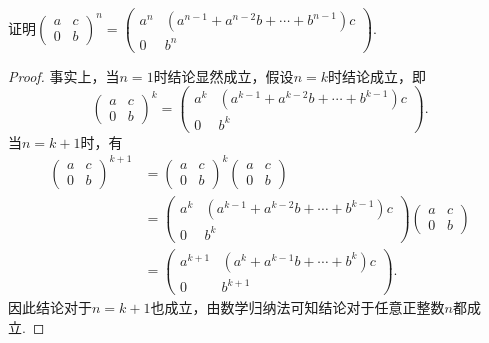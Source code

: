 \begin{enumerate}
          \begin{example}{}{}
              证明$\begin{pmatrix}
                      a & c \\ 0 & b
                  \end{pmatrix}^n=\begin{pmatrix}
                      a^n & (a^{n-1}+a^{n-2}b+\cdots+b^{n-1})c \\ 0 & b^n
                  \end{pmatrix}$.
          \end{example}
          \begin{proof}
              事实上，当$n=1$时结论显然成立，假设$n=k$时结论成立，即
              \[\begin{pmatrix}
                      a & c \\ 0 & b
                  \end{pmatrix}^k=\begin{pmatrix}
                      a^k & (a^{k-1}+a^{k-2}b+\cdots+b^{k-1})c \\ 0 & b^k
                  \end{pmatrix}.\]
              当$n=k+1$时，有
              \begin{align*}
                  \begin{pmatrix}
                      a & c \\ 0 & b
                  \end{pmatrix}^{k+1}
                   & =\begin{pmatrix}
                          a & c \\ 0 & b
                      \end{pmatrix}^k
                  \begin{pmatrix}
                      a & c \\ 0 & b
                  \end{pmatrix}                                         \\
                   & =\begin{pmatrix}
                          a^k & (a^{k-1}+a^{k-2}b+\cdots+b^{k-1})c \\ 0 & b^k
                      \end{pmatrix}\begin{pmatrix}
                                       a & c \\ 0 & b
                                   \end{pmatrix} \\
                   & =\begin{pmatrix}
                          a^{k+1} & (a^k+a^{k-1}b+\cdots+b^k)c \\
                          0       & b^{k+1}
                      \end{pmatrix}.
              \end{align*}
              因此结论对于$n=k+1$也成立，由数学归纳法可知结论对于任意正整数$n$都成立.
          \end{proof}


\end{enumerate}
